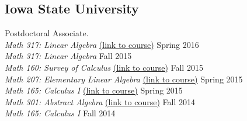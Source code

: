 \medskip

\subsection*{Iowa State University} Postdoctoral Associate.\\[3pt]
\textsl{Math 317: Linear Algebra} \href{https://github.com/williamdemeo/Math317-Spring2016}{{\small (link to course)}} \hfill  Spring 2016\\[\Xpt]
\textsl{Math 317: Linear Algebra} %
\hfill  Fall 2015\\[\Xpt]
\textsl{Math 160: Survey of Calculus} \href{https://github.com/williamdemeo/Math160-Fall2015}{{\small (link to course)}} \hfill  Fall 2015\\[\Xpt]
\textsl{Math 207: Elementary Linear Algebra} \href{https://github.com/williamdemeo/Math207-Spring2015}{{\small (link to course)}} \hfill  Spring 2015\\[\Xpt]
\textsl{Math 165: Calculus I} \href{https://github.com/williamdemeo/Math165-Spring2015}{{\small (link to course)}} \hfill  Spring 2015\\[\Xpt]
\textsl{Math 301: Abstract Algebra} \href{https://github.com/williamdemeo/Math301-Fall2014}{{\small (link to course)}} \hfill  Fall 2014\\[\Xpt]
\textsl{Math 165: Calculus I} \hfill  Fall 2014

\medskip

